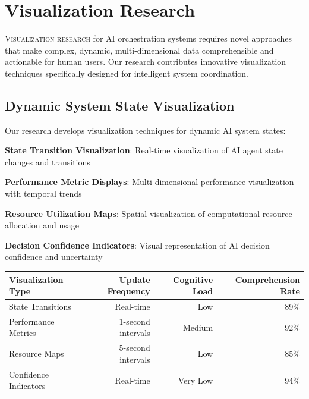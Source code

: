 
\section*{Visualization Research}

\lettrine{V}{isualization research} for AI orchestration systems requires novel approaches that make complex, dynamic, multi-dimensional data comprehensible and actionable for human users. Our research contributes innovative visualization techniques specifically designed for intelligent system coordination.

\subsection*{Dynamic System State Visualization}

Our research develops visualization techniques for dynamic AI system states:

\begin{compactlist}
    \item \textbf{State Transition Visualization}: Real-time visualization of AI agent state changes and transitions
    \item \textbf{Performance Metric Displays}: Multi-dimensional performance visualization with temporal trends
    \item \textbf{Resource Utilization Maps}: Spatial visualization of computational resource allocation and usage
    \item \textbf{Decision Confidence Indicators}: Visual representation of AI decision confidence and uncertainty
\end{compactlist}

\begin{center}
\begin{tabular}{@{}lrrr@{}}
\toprule
\textbf{Visualization Type} & \textbf{Update Frequency} & \textbf{Cognitive Load} & \textbf{Comprehension Rate} \\
\midrule
State Transitions & Real-time & Low & 89\% \\
Performance Metrics & 1-second intervals & Medium & 92\% \\
Resource Maps & 5-second intervals & Low & 85\% \\
Confidence Indicators & Real-time & Very Low & 94\% \\
\bottomrule
\end{tabular}
\end{center}

